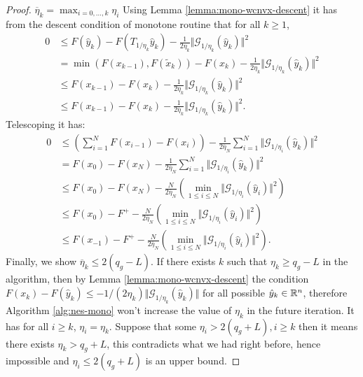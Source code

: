 \documentclass[12pt]{report}
\begin{document}
        \begin{proof}
            $\overline \eta_k = \max_{i = 0, \ldots, k}\eta_i$
            Using Lemma \ref{lemma:mono-wcnvx-descent} it has from the descent condition of monotone routine that for all $k \ge 1$,  
            \begin{align*}
                0 &\le F(\hat y_k) - F\left(T_{1/\eta_k}\hat y_k\right) 
                - \frac{1}{2\eta_k}\Vert \mathcal G_{1/\eta_k}(\hat y_k)\Vert^2
                \\
                &= \min(F(x_{k - 1}), F(\tilde x_k)) - F(x_k) 
                - \frac{1}{2\eta_k}\Vert \mathcal G_{1/\eta_k}(\hat y_k)\Vert^2
                \\
                &\le 
                F(x_{k - 1}) - F(x_k) - \frac{1}{2\eta_k} \Vert \mathcal G_{1/\eta_k}(\hat y_k)\Vert^2
                \\
                &\le 
                F(x_{k - 1}) - F(x_k) - \frac{1}{2\overline\eta_k} \Vert \mathcal G_{1/\eta_k}(\hat y_k)\Vert^2. 
            \end{align*}
            Telescoping it has: 
            \begin{align*}
                0 &\le \left(
                    \sum_{i = 1}^{N} F(x_{i - 1}) - F(x_i)
                \right) 
                - \frac{1}{2\overline\eta_N}\sum_{i = 1}^{N} \Vert \mathcal G_{1/\eta_i}(\hat y_k)\Vert^2
                \\
                &= 
                F(x_{0}) - F(x_N) 
                - \frac{1}{2\overline\eta_N}\sum_{i = 1}^{N} \Vert \mathcal G_{1/\eta_i}(\hat y_k)\Vert^2
                \\
                &\le 
                F(x_{0}) - F(x_N) 
                - \frac{N }{2\overline\eta_N}\left(
                    \min_{1 \le i \le N} \Vert \mathcal G_{1/\eta_i}(\hat y_i)\Vert^2
                \right)
                \\
                &\le F(x_{0}) - F^+ 
                - \frac{N}{2\overline\eta_N}\left(
                    \min_{1 \le i \le N} \Vert \mathcal G_{1/\eta_i}(\hat y_i)\Vert^2
                \right)
                \\
                &\le F(x_{-1}) - F^+ 
                - \frac{N}{2\overline\eta_N}\left(
                    \min_{1 \le i \le N} \Vert \mathcal G_{1/\eta_i}(\hat y_i)\Vert^2
                \right).
            \end{align*}
            Finally, we show $\overline \eta_k \le 2(q_g - L)$. 
            If there exists $k$ such that $\eta_k \ge q_g - L$ in the algorithm, then by Lemma \ref{lemma:mono-wcnvx-descent} the condition $F(x_k) - F(\hat y_k) \le -1/(2\eta_k)\Vert \mathcal G_{1/\eta_k}(\hat y_k)\Vert$ for all possible $\hat y_k \in \mathbb R^n$, therefore Algorithm \ref{alg:nes-mono} won't increase the value of $\eta_k$ in the future iteration. 
            It has for all $i \ge k$, $\eta_i = \eta_k$. 
            Suppose that some $\eta_i > 2(q_g + L), i \ge k$ then it means there exists $\eta_k > q_g + L$, this contradicts what we had right before, hence impossible and $\eta_i \le 2(q_g + L)$ is an upper bound. 
        \end{proof}
\end{document}

